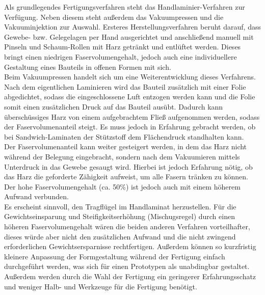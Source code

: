 \noindent Als grundlegendes Fertigungsverfahren steht das Handlaminier-Verfahren zur Verfügung. Neben diesem steht außerdem das Vakuumpressen und die Vakuuminjektion zur Auswahl. Ersteres Herstellungsverfahren beruht darauf, dass Gewebe- bzw. Gelegelagen per Hand ausgerichtet und anschließend manuell mit Pinseln und Schaum-Rollen mit Harz getränkt und entlüftet werden. Dieses bringt einen niedrigen Faservolumengehalt, jedoch auch eine individuellere Gestaltung eines Bauteils in offenen Formen mit sich. \\
Beim Vakuumpressen handelt sich um eine Weiterentwicklung dieses Verfahrens. Nach dem eigentlichen Laminieren wird das Bauteil zusätzlich mit einer Folie abgedichtet, sodass die eingeschlossene Luft entzogen werden kann und die Folie somit einen zusätzlichen Druck auf das Bauteil ausübt. Dadurch kann überschüssiges Harz von einem aufgebrachtem Fließ aufgenommen werden, sodass der Faservolumenanteil steigt. Es muss jedoch in Erfahrung gebracht werden, ob bei Sandwich-Laminaten der Stützstoff dem Flächendruck standhalten kann.\\
Der Faservolumenanteil kann weiter gesteigert werden, in dem das Harz nicht während der Belegung eingebracht, sondern nach dem Vakuumieren mittels Unterdruck in das Gewebe gesaugt wird. Hierbei ist jedoch Erfahrung nötig, ob das Harz die geforderte Zähigkeit aufweist, um alle Fasern tränken zu können. Der hohe Faservolumengehalt (ca. 50\%) ist jedoch auch mit einem höherem Aufwand verbunden.\\

\noindent Es erscheint sinnvoll, den Tragflügel im Handlaminat herzustellen. Für die Gewichtseinsparung und Steifigkeitserhöhung (Mischugsregel) durch einen höheren Faservolumengehalt wären die beiden anderen Verfahren vorteilhafter, dieses würde aber nicht den zusätzlichen Aufwand und die nicht zwingend erforderlichen Gewichtsersparnisse rechtfertigen. Außerdem können so kurzfristig kleinere Anpassung der Formgestaltung während der Fertigung einfach durchgeführt werden, was sich für einen Prototypen als unabdingbar gestaltet. Außerdem werden durch die Wahl der Fertigung ein geringerer Erfahrungsschatz und weniger Halb- und Werkzeuge für die Fertigung benötigt.